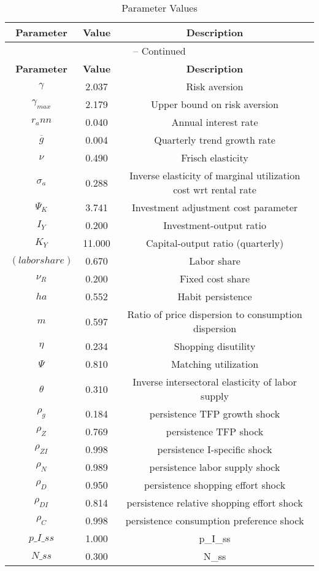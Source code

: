 \begin{center}
\begin{longtable}{ccc}
\caption{Parameter Values}\\%
\toprule%
\multicolumn{1}{c}{\textbf{Parameter}} &
\multicolumn{1}{c}{\textbf{Value}} &
 \multicolumn{1}{c}{\textbf{Description}}\\%
\midrule%
\endfirsthead
\multicolumn{3}{c}{{\tablename} \thetable{} -- Continued}\\%
\midrule%
\multicolumn{1}{c}{\textbf{Parameter}} &
\multicolumn{1}{c}{\textbf{Value}} &
  \multicolumn{1}{c}{\textbf{Description}}\\%
\midrule%
\endhead
${\gamma}$ 	 & 	 2.037 	 & 	 Risk aversion\\
${\gamma_{max}}$ 	 & 	 2.179 	 & 	 Upper bound on risk aversion\\
${r_ann}$ 	 & 	 0.040 	 & 	 Annual interest rate\\
${\overline{g}}$ 	 & 	 0.004 	 & 	 Quarterly trend growth rate\\
$\nu$ 	 & 	 0.490 	 & 	 Frisch elasticity\\
${\sigma_a}$ 	 & 	 0.288 	 & 	 Inverse elasticity of marginal utilization cost wrt rental rate\\
${\Psi_K}$ 	 & 	 3.741 	 & 	 Investment adjustment cost parameter\\
${I_Y}$ 	 & 	 0.200 	 & 	 Investment-output ratio\\
${K_Y}$ 	 & 	 11.000 	 & 	 Capital-output ratio (quarterly)\\
$(labor share)$ 	 & 	 0.670 	 & 	 Labor share\\
${\nu_R}$ 	 & 	 0.200 	 & 	 Fixed cost share\\
${ha}$ 	 & 	 0.552 	 & 	 Habit persistence\\
${m}$ 	 & 	 0.597 	 & 	 Ratio of price dispersion to consumption dispersion\\
${\eta}$ 	 & 	 0.234 	 & 	 Shopping disutility\\
${\Psi}$ 	 & 	 0.810 	 & 	 Matching utilization\\
${\theta}$ 	 & 	 0.310 	 & 	 Inverse intersectoral elasticity of labor supply\\
${\rho_g}$ 	 & 	 0.184 	 & 	 persistence TFP growth shock\\
${\rho_Z}$ 	 & 	 0.769 	 & 	 persistence TFP shock\\
${\rho_{ZI}}$ 	 & 	 0.998 	 & 	 persistence I-specific shock\\
${\rho_N}$ 	 & 	 0.989 	 & 	 persistence labor supply shock\\
${\rho_D}$ 	 & 	 0.950 	 & 	 persistence shopping effort shock\\
${\rho_{DI}}$ 	 & 	 0.814 	 & 	 persistence relative shopping effort shock\\
${\rho_C}$ 	 & 	 0.998 	 & 	 persistence consumption preference shock\\
$p\_I\_ss$ 	 & 	 1.000 	 & 	 p\_I\_ss\\
$N\_ss$ 	 & 	 0.300 	 & 	 N\_ss\\
\bottomrule%
\end{longtable}
\end{center}
